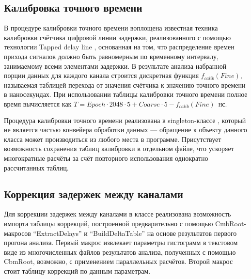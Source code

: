 \subsection{Калибровка точного времени}\label{sec:secSoftFineTimeCalib}

В процедуре калибровки точного времени воплощена известная техника калибровки счётчика цифровой линии задержки, реализованного с помощью технологии Tapped delay line \cite{TDLCALIB}, основанная на том, что распределение времен прихода сигналов должно быть равномерным по временному интервалу, занимаемому всеми элементами задержки. В результате анализа набранной порции данных для каждого канала строится дискретная функция $ f_{calib}(Fine) $, называемая таблицей перехода от значения счётчика к значению точного времени в наносекундах. При использовании таблицы калибровки точного времени полное время вычисляется как $ T = Epoch \cdot 2048 \cdot 5 + Coarse \cdot 5 - f_{calib}(Fine) $~нс.

Процедура калибровки точного времени реализована в singleton-классе , который не является частью конвейера обработки данных --- обращение к объекту данного класса может производиться из любого места в программе. Присутствует возможность сохранения таблиц калибровки в отдельном файле, что ускоряет многократные расчёты за счёт повторного использования однократно рассчитанных таблиц.

\subsection{Коррекция задержек между каналами}\label{sec:secSoftDelayCorr}

Для коррекции задержек между каналами в классе  реализована возможность импорта таблицы коррекций, построенной предварительно с помощью CmbRoot-макросов ``ExtractDelays'' и ``BuildDeltaTable'' на основе результатов первого прогона анализа. Первый макрос извлекает параметры гистограмм в текстовом виде из многочисленных файлов результатов анализа, полученных с помощью CbmRoot, возможно, с применением параллельных расчётов. Второй макрос стоит таблицу коррекций по данным параметрам.


